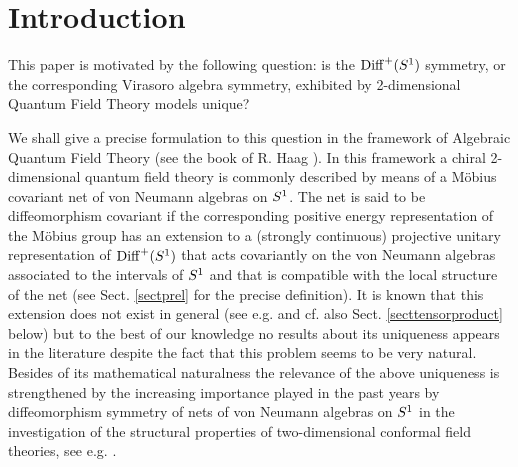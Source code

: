 \documentclass[12pt]{article}
\begin{document}
\begin{abstract} 
A M\"obius covariant net of von Neumann algebras 
on $S^1$ is diffeomorphism covariant if 
its M\"obius symmetry extends to diffeomorphism symmetry. 
We prove that in case the net is either a Virasoro net or any at least
$4$-regular net such an extension is unique: the local algebras
together with the M\"obius symmetry (equivalently: the local 
algebras together with the vacuum vector) completely determine it. 
We draw the two following conclusions for such theories. 
(1) The value of the central charge $c$ is an invariant and hence
the Virasoro nets for different values of $c$ are not isomorphic as 
M\"obius covariant nets.
(2) A vacuum preserving internal symmetry always commutes 
with the diffeomorphism symmetries. 
We further use our result to give a large class of new
examples of nets (even strongly additive ones), which are not
diffeomorphism covariant; i.e. which do not admit an 
extension of the symmetry to $\diff$. 
\end{abstract}

\section{Introduction}

This paper is motivated by the following question: is the $\diff$ symmetry, 
or the corresponding Virasoro algebra symmetry, exhibited by
2-dimensional Quantum Field Theory models unique?

We shall give a precise formulation to this question in the framework of 
Algebraic Quantum Field Theory (see the book of R. Haag \cite{Haag}). 
In this framework a chiral 2-dimensional quantum field theory is commonly 
described by means of a M\"obius covariant net of von Neumann algebras 
on $\s1$. The net is said to be diffeomorphism covariant if the 
corresponding positive energy representation of the M\"obius group 
has an extension to a (strongly continuous) projective unitary
representation of $\diff$ that acts covariantly on the von Neumann
algebras associated to the intervals of $\s1$ and that is compatible 
with the local structure of the net (see Sect. \ref{sectprel} for the
precise definition). 
It is known that this extension does not exist in general 
(see e.g. \cite{GLW,koester03a} and cf. also Sect. \ref{secttensorproduct} 
below) but to the best of our knowledge no results about its uniqueness 
appears in the literature despite the fact that this problem seems to be 
very natural. 
Besides of its mathematical naturalness the relevance of the above
uniqueness is strengthened by the increasing importance played in the past 
years by diffeomorphism symmetry of nets of von Neumann algebras on $\s1$ 
in the investigation of the structural properties of two-dimensional conformal 
field theories, see e.g. \cite{KL,KL2,koester03b,xu 2003,Carpi03b,LX}. 
\end{document}
